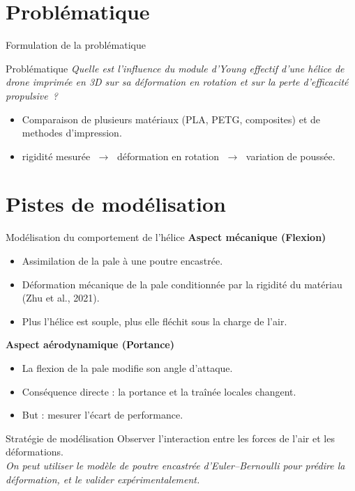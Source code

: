 \documentclass[aspectratio=169]{beamer}
\begin{document}
\section{Problématique}

\begin{frame}{Formulation de la problématique}
  \begin{block}{Problématique}
    \textit{Quelle est l'influence du module d'Young effectif d'une hélice de
      drone imprimée en 3D sur sa déformation en rotation et sur la perte
    d'efficacité propulsive~?}
  \end{block}

  \vspace{0.2cm}

  \begin{itemize}
    \item Comparaison de plusieurs matériaux (PLA, PETG, composites)
      et de methodes d'impression.
    \item
      \alert{rigidité mesurée} $\;\rightarrow\;$
      \alert{déformation en rotation} $\;\rightarrow\;$
      \alert{variation de poussée}.
  \end{itemize}
\end{frame}

\section{Pistes de modélisation}

\begin{frame}{Modélisation du comportement de l'hélice}
  \textbf{\textcolor{NavyTIPE}{Aspect mécanique (Flexion)}}
  \begin{itemize}
    \item Assimilation de la pale à une poutre encastrée.
    \item \alert{Déformation mécanique de la pale} conditionnée par la rigidité du matériau (Zhu et al., 2021).
    \item Plus l'hélice est souple, plus elle fléchit sous la charge de l'air.
  \end{itemize}

  \vspace{0.3cm}
  \textbf{\textcolor{NavyTIPE}{Aspect aérodynamique (Portance)}}
  \begin{itemize}
    \item La flexion de la pale modifie son angle d'attaque.
    \item Conséquence directe : la portance et la traînée locales changent.
    \item But : mesurer l'écart de performance.
  \end{itemize}

  \vspace{0.4cm}
  \begin{block}{Stratégie de modélisation}
    Observer l'interaction entre les forces de l'air et les déformations. \\
    \textit{On peut utiliser le modèle de poutre encastrée d'Euler--Bernoulli pour prédire la déformation, et le valider expérimentalement.}
  \end{block}
\end{frame}
\end{document}
